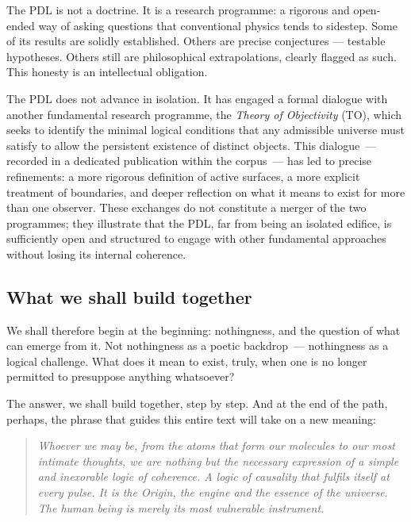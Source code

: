 \documentclass[12pt, a4paper, openright]{book}
\begin{document}
\medskip

The PDL is not a doctrine. It is a research programme: a rigorous and open-ended way of asking questions that conventional physics tends to sidestep. Some of its results are solidly established. Others are precise conjectures — testable hypotheses. Others still are philosophical extrapolations, clearly flagged as such. This honesty is an intellectual obligation.

\medskip

The PDL does not advance in isolation. It has engaged a formal dialogue with another fundamental research programme, the \emph{Theory of Objectivity} (TO), which seeks to identify the minimal logical conditions that any admissible universe must satisfy to allow the persistent existence of distinct objects. This dialogue~--- recorded in a dedicated publication within the corpus~--- has led to precise refinements: a more rigorous definition of active surfaces, a more explicit treatment of boundaries, and deeper reflection on what it means to exist for more than one observer. These exchanges do not constitute a merger of the two programmes; they illustrate that the PDL, far from being an isolated edifice, is sufficiently open and structured to engage with other fundamental approaches without losing its internal coherence.

\subsection*{What we shall build together}

We shall therefore begin at the beginning: nothingness, and the question of what can emerge from it. Not nothingness as a poetic backdrop~--- nothingness as a logical challenge. What does it mean to exist, truly, when one is no longer permitted to presuppose anything whatsoever?

\medskip

The answer, we shall build together, step by step. And at the end of the path, perhaps, the phrase that guides this entire text will take on a new meaning:

\begin{quote}
\itshape Whoever we may be, from the atoms that form our molecules to our most intimate thoughts, we are nothing but the necessary expression of a simple and inexorable logic of coherence. A logic of causality that fulfils itself at every pulse. It is the Origin, the engine and the essence of the universe. The human being is merely its most vulnerable instrument.
\end{quote}
\end{document}
